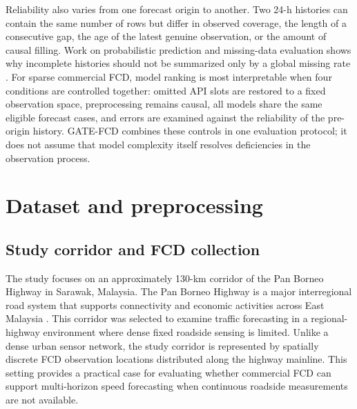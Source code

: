 \documentclass[pdflatex,sn-basic,Numbered]{sn-jnl}
\begin{document}
Reliability also varies from one forecast origin to another. Two 24-h histories can contain the same number of rows but differ in observed coverage, the length of a consecutive gap, the age of the latest genuine observation, or the amount of causal filling. Work on probabilistic prediction and missing-data evaluation shows why incomplete histories should not be summarized only by a global missing rate \cite{Xu2023AGNP,Zhang2024MissingData,Chan2023MissingTrafficData}. For sparse commercial FCD, model ranking is most interpretable when four conditions are controlled together: omitted API slots are restored to a fixed observation space, preprocessing remains causal, all models share the same eligible forecast cases, and errors are examined against the reliability of the pre-origin history. GATE-FCD combines these controls in one evaluation protocol; it does not assume that model complexity itself resolves deficiencies in the observation process.

\section{Dataset and preprocessing}
\label{sec:dataset}

\subsection{Study corridor and FCD collection}
\label{subsec:corridor}

The study focuses on an approximately 130-km corridor of the Pan Borneo Highway in Sarawak, Malaysia. The Pan Borneo Highway is a major interregional road system that supports connectivity and economic activities across East Malaysia \cite{Kam2025PanBorneo,Azmi2025PanBorneo}. This corridor was selected to examine traffic forecasting in a regional-highway environment where dense fixed roadside sensing is limited. Unlike a dense urban sensor network, the study corridor is represented by spatially discrete FCD observation locations distributed along the highway mainline. This setting provides a practical case for evaluating whether commercial FCD can support multi-horizon speed forecasting when continuous roadside measurements are not available.
\end{document}
